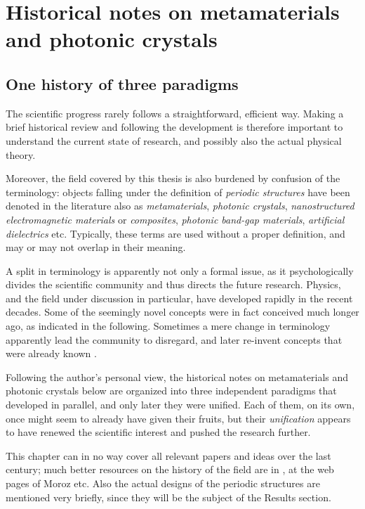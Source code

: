 
\section{Historical notes on metamaterials and photonic crystals}%
\subsection{One history of three paradigms} %
The scientific progress rarely follows a straightforward, efficient way. Making a brief historical review and following the development is therefore important to understand the current state of research, and possibly also the actual physical theory. 

Moreover, the field covered by this thesis is also burdened by confusion of the terminology: objects falling under the definition of \textit{periodic structures} have been denoted in the literature also as \textit{metamaterials}, \textit{photonic crystals}, \textit{nanostructured electromagnetic materials} or \textit{composites}, \textit{photonic band-gap materials}, \textit{artificial dielectrics} etc. Typically, these terms are used without a proper definition, and may or may not overlap in their meaning. 

A split in terminology is apparently not only a formal issue, as it psychologically divides the scientific community and thus directs the future research.
Physics, and the field under discussion in particular, have developed rapidly in the recent decades. Some of the seemingly novel concepts were in fact conceived much longer ago, as indicated in the following. Sometimes a mere change in terminology apparently lead the community to disregard, and later re-invent concepts that were already known \cite[p. 5]{klingshirn2007semiconductor}. 


Following the author's personal view,
the historical notes on metamaterials and photonic crystals below are organized into three independent paradigms that developed in parallel, and only later they were unified. Each of them, on its own, once might seem to already have given their fruits, but their \textit{unification} appears to have renewed the scientific interest and pushed the research further. 

This chapter can in no way cover all relevant papers and ideas over the last century; much better resources on the history of the field are in \cite{shamonina2007metamaterials,eleftheriades2012transforming, paudyal2013left}, at the web pages of Moroz \cite{moroz} etc. Also the actual designs of the periodic structures are mentioned very briefly, since they will be the subject of the Results section.

